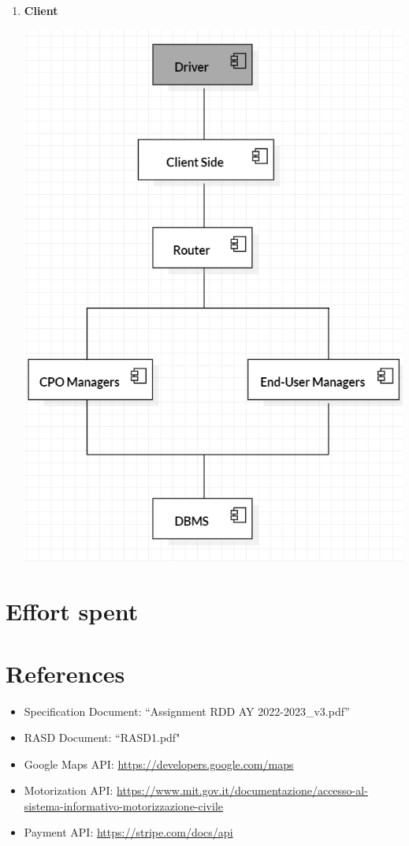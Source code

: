 \documentclass[a4paper]{report}
\begin{document}
\begin{enumerate}
    \item \textbf{Client}\par
    \begin{minipage}{\linewidth}
        \centering
        \includegraphics[scale=0.5]{img/INTEGRATION_4.png}
    \end{minipage}
\end{enumerate}

\chapter{Effort spent}

\chapter{References}
\begin{itemize}
\item Specification Document: “Assignment RDD AY 2022-2023\_v3.pdf”
\item RASD Document: “RASD1.pdf"
\item Google Maps API: \href{https://developers.google.com/maps}{https://developers.google.com/maps}
\item Motorization API: \href{https://www.mit.gov.it/documentazione/accesso-al-sistema-informativo-motorizzazione-civile}{https://www.mit.gov.it/documentazione/accesso-al-sistema-informativo-motorizzazione-civile}
\item Payment API: \href{https://stripe.com/docs/api}{https://stripe.com/docs/api}
\end{itemize}
\end{document}
